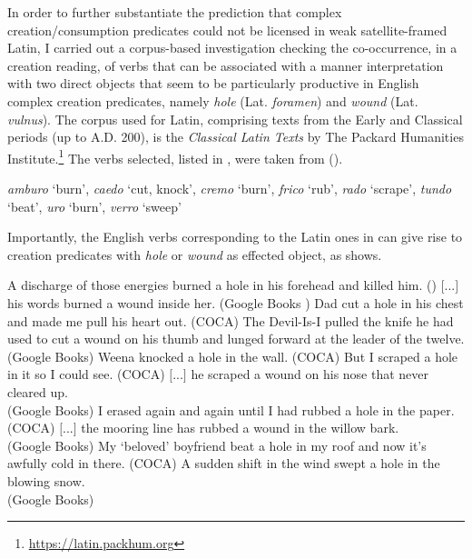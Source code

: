 \documentclass[output=paper,colorlinks,citecolor=brown]{langscibook}
\begin{document}
In order to further substantiate the prediction that complex creation/con\-sum\-ption predicates could not be licensed in weak satellite-framed Latin, I carried out a corpus-based investigation checking the co-occurrence, in a creation reading, of verbs that can be associated with a manner interpretation with two direct objects that seem to be particularly productive in English complex creation predicates, namely \textit{hole} (Lat. \textit{foramen}) and \textit{wound} (Lat. \textit{vulnus}). The corpus used for Latin, comprising texts from the Early and Classical periods (up to A.D. 200), is the \textit{Classical Latin Texts} by The Packard Humanities Institute.\footnote{\url{https://latin.packhum.org}} The verbs selected, listed in , were taken from \citeauthor{Acedo-Matellan2016} (\citeyear{Acedo-Matellan2016}).

\ea \label{mannerLatin} \textit{amburo} `burn', \textit{caedo} `cut, knock', \textit{cremo} `burn', \textit{frico} `rub', \textit{rado} `scrape', \textit{tundo} `beat', \textit{uro} `burn', \textit{verro} `sweep' \z

\noindent Importantly, the English verbs corresponding to the Latin ones in  can give rise to creation predicates with \textit{hole} or \textit{wound} as effected object, as  shows.

\ea \label{EngLat} \ea A discharge of those energies burned a hole in his forehead and killed him. \hfill (\citealt[155]{AusensiAndBigolin2023})
\ex $[$...$]$ his words burned a wound inside her. \hfill (Google Books%
)
\ex Dad cut a hole in his chest and made me pull his heart out. \hfill (COCA)
\ex The Devil-Is-I pulled the knife he had used to cut a wound on his thumb and lunged forward at the leader of the twelve. \hfill (Google Books)
\ex Weena knocked a hole in the wall. \hfill (COCA)
\ex But I scraped a hole in it so I could see. \hfill (COCA)
\ex $[$...$]$ he scraped a wound on his nose that never cleared up.\\ \hfill (Google Books)
\ex I erased again and again until I had rubbed a hole in the paper. \\\hfill (COCA)
\ex $[$...$]$ the mooring line has rubbed a wound in the willow bark. \\\hfill (Google Books)
\ex My `beloved' boyfriend beat a hole in my roof and now it's awfully cold in there. \hfill (COCA)
\ex A sudden shift in the wind swept a hole in the blowing snow. \\\hfill (Google Books) \z \z
\end{document}
